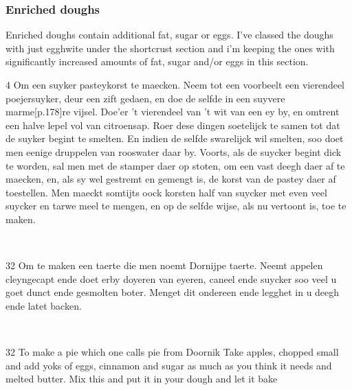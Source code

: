 \documentclass[a4paper]{article}
\begin{document}
\subsubsection{Enriched doughs}
Enriched doughs contain additional fat, sugar or eggs. I’ve classed the doughs with just egghwite under the shortcrust section and i’m keeping the ones with significantly increased amounts of fat, sugar and/or eggs in this section.


\medskip
\begin{minipage}{.45\textwidth}
4 Om een suyker pasteykorst te maecken. 
Neem tot een voorbeelt een vierendeel poejersuyker, deur een zift gedaen, en doe de selfde in een suyvere marme[p.178]re vijsel. Doe’er ’t vierendeel van ’t wit van een ey by, en omtrent een halve lepel vol van citroensap. Roer dese dingen soetelijck te samen tot dat de suyker begint te smelten. En indien de selfde swarelijck wil smelten, soo doet men eenige druppelen van rooswater daar by. Voorts, als de suycker begint dick te worden, sal men met de stamper daer op stoten, om een vast deegh daer af te maecken, en, als sy wel gestremt en gemengt is, de korst van de pastey daer af toestellen.
    Men maeckt somtijts oock korsten half van suycker met even veel suycker en tarwe meel te mengen, en op de selfde wijse, als nu vertoont is, toe te maken.	\cite{hp}
\end{minipage}
\begin{minipage}{0.05\textwidth}
\ \ \ 
\end{minipage}
\begin{minipage}{.45\textwidth}
\end{minipage}


 

\medskip
\begin{minipage}{.45\textwidth}
32 Om te maken een taerte die men noemt Dornijpe taerte.
Neemt appelen cleyngecapt ende doet erby doyeren van eyeren, caneel ende suycker soo veel u goet dunct ende gesmolten boter. Menget dit ondereen ende legghet in u deegh ende latet backen.	\cite{cb}
\end{minipage}
\begin{minipage}{0.05\textwidth}
\ \ \ 
\end{minipage}
\begin{minipage}{.45\textwidth}
32 To make a pie which one calls pie from Doornik
Take apples, chopped small and add yoks of eggs, cinnamon and sugar as much as you think it needs and melted butter. Mix this and put it in your dough and let it bake
\end{minipage}
\end{document}
